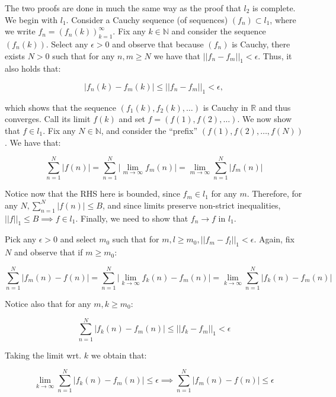 \begin{solution}
    
    The two proofs are done in much the same way as the proof that $l_2$ is complete.
    We begin with $l_1$.
    Consider a Cauchy sequence (of sequences) $(f_n) \subset l_1$, where we write $f_n = (f_n(k))_{k=1}^{\infty}$.
    Fix any $k \in \mathbb{N}$ and consider the sequence $(f_n(k))$.
    Select any $\epsilon > 0$ and observe that because $(f_n)$ is Cauchy, there exists $N > 0$ such that for any $n, m \geq N$ we have that $\lvert \lvert f_n - f_m \rvert \rvert _{1} < \epsilon$.
    Thus, it also holds that:

    \[\lvert f_n(k) - f_m(k) \rvert \leq \lvert \lvert f_n - f_m \rvert \rvert _{1} < \epsilon,\]

    which shows that the sequence $(f_1(k), f_2(k), \ldots)$ is Cauchy in $\mathbb{R}$ and thus converges.
    Call its limit $f(k)$ and set $f = (f(1), f(2), \ldots)$.
    We now show that $f \in l_1$.
    Fix any $N \in \mathbb{N}$, and consider the ``prefix'' $(f(1), f(2), \ldots, f(N))$.
    We have that:

    \[\sum_{n=1}^{N} \lvert f(n) \rvert = \sum_{n=1}^{N} \lvert \lim_{m \rightarrow \infty} f_m(n) \rvert = \lim_{m \rightarrow \infty} \sum_{n=1}^{N} \lvert f_m(n) \rvert\]

    Notice now that the RHS here is bounded, since $f_m \in l_1$ for any $m$.
    Therefore, for any $N, \sum_{n=1}^{N} \lvert f(n) \rvert \leq B$, and since limits preserve non-strict inequalities, $\lvert \lvert f \rvert \rvert _{1} \leq B \implies f \in l_1$.
    Finally, we need to show that $f_n \rightarrow f$ in $l_1$.
    
    Pick any $\epsilon > 0$ and select $m_0$ such that for $m, l \geq m_0, \lvert \lvert f_m - f_l \rvert \rvert _{1} < \epsilon$.
    Again, fix $N$ and observe that if $m \geq m_0$:

    \[\sum_{n=1}^{N} \lvert f_m(n) - f(n) \rvert = \sum_{n=1}^{N} \lvert \lim_{k \rightarrow \infty} f_k(n) - f_m(n) \rvert = \lim_{k \rightarrow \infty} \sum_{n=1}^{N} \lvert f_k(n) - f_m(n) \rvert\]

    Notice also that for any $m, k \geq m_0$:
    
    \[ \sum_{n=1}^{N} \lvert f_k(n) - f_m(n) \rvert \leq \lvert \lvert f_k - f_m \rvert \rvert_1 < \epsilon \]
    
    Taking the limit wrt. $k$ we obtain that:

    \[\lim_{k \rightarrow \infty} \sum_{n=1}^{N} \lvert f_k(n) - f_m(n) \rvert \leq \epsilon \implies \sum_{n=1}^{N} \lvert f_m(n) - f(n) \rvert \leq \epsilon\]



\end{solution}
